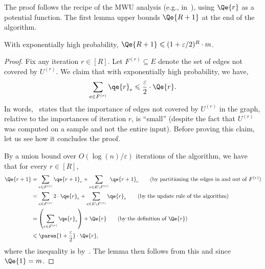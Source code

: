 \documentclass{article}
\renewcommand{\leq}{\leqslant}
\DeclarePairedDelimiter{\paren}()
\newcommand{\eps}{\varepsilon}
\begin{document}
The proof follows the recipe of the MWU analysis (e.g., in~\cite{AroraHK12}), using $\Qe{r}$ as a potential function. The first lemma upper bounds $\Qe{R+1}$ at the end of the algorithm. 
\begin{lemma}\label{lem:Qr-small-bipartite}
	With exponentially high probability, $\Qe{R+1} \leq (1+\eps/2)^{R} \cdot m$.  
\end{lemma}
\begin{proof}
	Fix any iteration $r \in [R]$. Let $F^{(r)} \subseteq E$ denote the set of edges {not} covered by $U^{(r)}$. We claim that with exponentially high probability, we have,
	\begin{align}
		\sum_{e \in F^{(r)}} \qe{r}_e \leq \frac{\eps}{2} \cdot \Qe{r}. \label{eq:clm1-bipartite}
	\end{align}
	In words,~ states that the importance of edges {not} covered by $U^{(r)}$ in the graph, relative to the importances of iteration $r$, is ``small'' (despite the fact that $U^{(r)}$ was computed
	on a sample and not the entire input). Before proving this claim, let us see how it concludes the proof. 
	
	By a union bound over $O(\log{(n)}/\eps)$ iterations of the algorithm, we have that for every $r \in [R]$, 
	\begin{align*}
		\Qe{r+1} &= \sum_{e \in F^{(r)}} \qe{r+1}_e + \sum_{e \in E \setminus F^{(r)}} \qe{r+1}_e \tag{by partitioning the edges in and out of $F^{(r)}$} \\
		&= \sum_{e \in F^{(r)}} 2 \cdot \qe{r}_e + \sum_{e \in E \setminus F^{(r)}} \qe{r}_e \tag{by the update rule of the algorithm} \\
		&= \left(\sum_{e \in F^{(r)}} \qe{r}_e\right) + \Qe{r} \tag{by the definition of $\Qe{r}$} \\
		&\leq \paren{1+\frac{\eps}{2}} \cdot \Qe{r},
	\end{align*}
	where the inequality is by~. The lemma then follows from this and since $\Qe{1} = m$. 
	

\end{proof}
\end{document}
